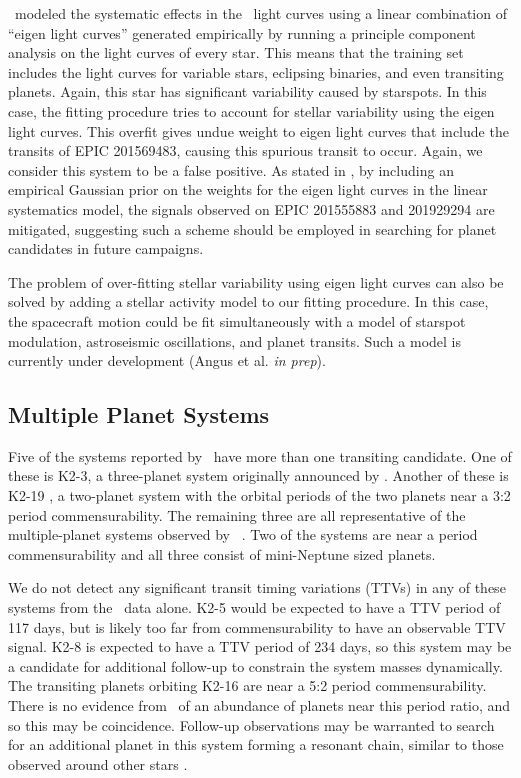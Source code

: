 \paperit\ modeled the systematic effects in the \KT\ light curves using a
linear combination of ``eigen light curves'' generated empirically by running
a principle component analysis on the light curves of every star.
This means that the training set includes the light curves for variable stars,
eclipsing binaries, and even transiting planets.
Again, this star has significant variability caused by starspots.
In this case, the fitting procedure tries to account for stellar variability using
the eigen light curves.
This overfit gives undue weight to eigen light curves that include the transits
of EPIC 201569483, causing this spurious transit to occur.
Again, we consider this system to be a false positive.
As stated in , by including an empirical Gaussian
prior on the weights for the eigen light curves in the linear systematics model,
the signals observed on EPIC 201555883 and 201929294 are mitigated, suggesting
such a scheme should be employed in searching for planet candidates in future
campaigns.

The problem of over-fitting stellar variability using eigen light curves can also be
solved by adding a stellar activity model to our fitting procedure.
In this case, the spacecraft motion could be fit simultaneously with a model
of starspot modulation, astroseismic oscillations, and planet transits.
Such a model is currently under development (Angus et al. \textit{in prep}).


\subsection{Multiple Planet Systems}
Five of the systems reported by \paperit\ have more than one transiting
candidate.
One of these is K2-3, a three-planet system originally announced by
\citet{Crossfield15}.
Another of these is K2-19 \citep{Armstrong15b}, a two-planet system with the
orbital periods of the two planets near a 3:2 period commensurability.
The remaining three are all representative of the multiple-planet systems observed by
\kep\ \citep{Lissauer11b, Fabrycky14}.
Two of the systems are near a period commensurability and all three consist of
mini-Neptune sized planets.



We do not detect any significant transit timing variations (TTVs) in any of these systems from
the \KT\ data alone.
K2-5 would be expected to have a TTV period of 117 days, but
is likely too far from commensurability to have an observable TTV signal.
K2-8 is expected to have a TTV period of 234 days, so this system may be a candidate
for additional follow-up to constrain the system masses dynamically.
The transiting planets orbiting K2-16 are near a 5:2 period commensurability.
There is no evidence from \kep\ of an abundance of planets near this period ratio, and so this
may be coincidence.
Follow-up observations may be warranted to search for an additional planet in this system
forming a resonant chain, similar to those observed around other stars \citep[e.g.][]{Swift13,
Campante15}.

